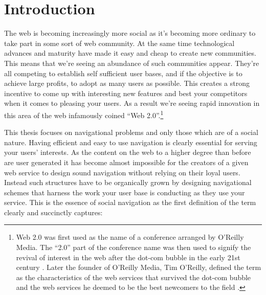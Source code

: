 \chapter{Introduction}

%
%

The web is becoming increasingly more social as it's becoming more ordinary to
take part in some sort of web community. At the same time technological
advances and maturity have made it easy and cheap to create new communities.
This means that we're seeing an abundance of such communities appear.
They're all competing to establish self sufficient user bases, and if the
objective is to achieve large profits, to adopt as many users
as possible. This creates a strong incentive to come up with interesting new
features and best your competitors when it comes to pleasing your users.
As a result we're seeing rapid innovation in this area of the web infamously
coined ``Web 2.0''.\footnote{%
Web 2.0 was first used as the name of a conference arranged by
O'Reilly Media. The ``2.0'' part of the conference name was then used to
signify the revival of interest in the web after the dot-com bubble in the
early 21st century \citep{oreilly07}.
Later the founder of O'Reilly Media, Tim O'Reilly, defined
the term as the characteristics of the web services that survived the dot-com
bubble and the web services he deemed to be the best newcomers to the
field \citep{oreilly05}.}

This thesis focuses on navigational problems and only those which are of a
social nature. Having efficient and easy to use navigation is clearly
essential for serving your users' interests. As the content on the web to a
higher degree than before are user generated it has become almost impossible
for the creators of a given web service to design sound navigation without
relying on their loyal users. Instead such structures have to be organically
grown by designing navigational schemes that harness the work your user base
is conducting as they use your service. This is the essence of social
navigation as the first definition of the term clearly and succinctly
captures:

